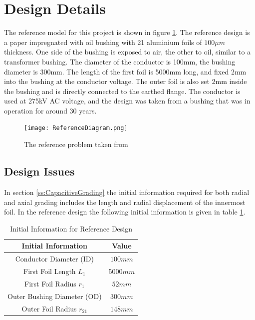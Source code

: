
\section{Design Details}
The reference model for this project is shown in figure \ref{figure:refproblem}. 
The reference design is a paper impregnated with oil bushing with 21 aluminium foils of $100\mu m$ thickness.
One side of the bushing is exposed to air, the other to oil, similar to a transformer bushing.
The diameter of the conductor is 100mm, the bushing diameter is 300mm.
The length of the first foil is 5000mm long, and fixed 2mm into the bushing at the conductor voltage.
The outer foil is also set 2mm inside the bushing and is directly connected to the earthed flange.
The conductor is used at 275kV AC voltage, and the design was taken from a bushing that was in operation for around 30 years.
\begin{figure}[!h]
   \centering
   \texttt{[image: ReferenceDiagram.png]}
   \caption{The reference problem taken from \cite{Chen14}}
   \label{figure:refproblem}
\end{figure}

\subsection{Design Issues} \label{Section:Design Issues}
In section \ref{ss:CapacitiveGrading} the initial information required for both radial and axial grading includes the length and radial displacement of the innermost foil.
In the reference design the following initial information is given in table \ref{table:initinfo}.

\begin{table}[!htb]
\caption{Initial Information for Reference Design}
\label{table:initinfo}
\begin{center}
\begin{tabular}{cc}
\toprule
\textbf{Initial Information} & \textbf{Value} \\ \toprule
Conductor Diameter (ID) & $100mm$ \\
First Foil Length $L_1$ & $5000mm$ \\
First Foil Radius $r_1$&$52mm$ \\
Outer Bushing Diameter (OD) & $300mm$\\
Outer Foil Radius $r_{21}$ & $148mm$\\
\bottomrule
\end{tabular}
\end{center}
\end{table} 

